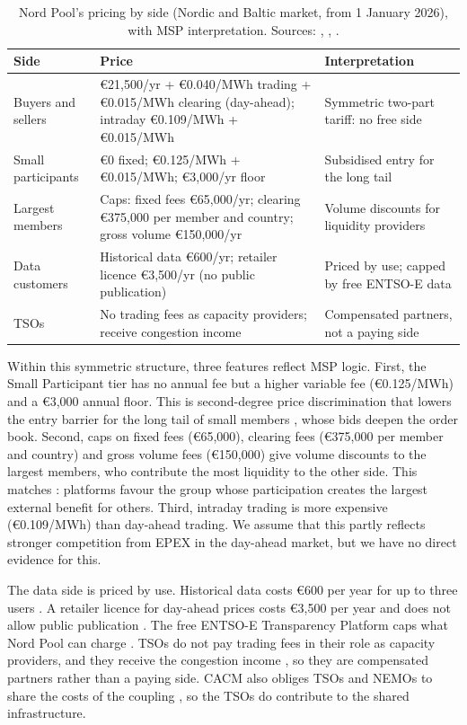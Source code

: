\begin{table}[ht]
\centering
\small
\caption{Nord Pool's pricing by side (Nordic and Baltic market, from 1 January 2026), with MSP interpretation. Sources: \citet{NPFees2026}, \citet{ERR2022}, \citet{NPData}.}
\label{tab:pricing}
\begin{tabularx}{\textwidth}{L{3.0cm} L{5.4cm} Y}
\toprule
\textbf{Side} & \textbf{Price} & \textbf{Interpretation} \\
\midrule
Buyers and sellers & €21,500/yr + €0.040/MWh trading + €0.015/MWh clearing (day-ahead); intraday €0.109/MWh + €0.015/MWh & Symmetric two-part tariff: no free side \\
Small participants & €0 fixed; €0.125/MWh + €0.015/MWh; €3,000/yr floor & Subsidised entry for the long tail \\
Largest members & Caps: fixed fees €65,000/yr; clearing €375,000 per member and country; gross volume €150,000/yr & Volume discounts for liquidity providers \\
Data customers & Historical data €600/yr; retailer licence €3,500/yr (no public publication) & Priced by use; capped by free ENTSO-E data \\
TSOs & No trading fees as capacity providers; receive congestion income & Compensated partners, not a paying side \\
\bottomrule
\end{tabularx}
\end{table}

Within this symmetric structure, three features reflect MSP logic. First, the Small Participant tier has no annual fee but a higher variable fee (€0.125/MWh) and a €3,000 annual floor. This is second-degree price discrimination that lowers the entry barrier for the long tail of small members \citep[Ch.~16]{OverbyAudestad2021}, whose bids deepen the order book. Second, caps on fixed fees (€65,000), clearing fees (€375,000 per member and country) and gross volume fees (€150,000) give volume discounts to the largest members, who contribute the most liquidity to the other side. This matches \citet{Armstrong2006}: platforms favour the group whose participation creates the largest external benefit for others. Third, intraday trading is more expensive (€0.109/MWh) than day-ahead trading. We assume that this partly reflects stronger competition from EPEX in the day-ahead market, but we have no direct evidence for this.

The data side is priced by use. Historical data costs €600 per year for up to three users \citep{ERR2022}. A retailer licence for day-ahead prices costs €3,500 per year and does not allow public publication \citep{NPData}. The free ENTSO-E Transparency Platform caps what Nord Pool can charge \citep{ERR2022}. TSOs do not pay trading fees in their role as capacity providers, and they receive the congestion income \citep{EU2019943}, so they are compensated partners rather than a paying side. CACM also obliges TSOs and NEMOs to share the costs of the coupling \citep{CACM2015}, so the TSOs do contribute to the shared infrastructure.

